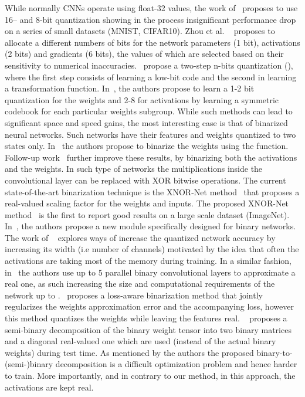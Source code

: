 \documentclass[10pt,twocolumn,letterpaper]{article}
\begin{document}
While normally CNNs operate using float-32 values, the work of~\cite{courbariaux2014training, lin2015fixed} proposes to use 16-- and 8-bit quantization showing in the process insignificant performance drop on a series of small datasets (MNIST, CIFAR10). Zhou et al. ~\cite{zhou2016dorefa} proposes to allocate a different numbers of bits for the network parameters (1 bit), activations (2 bits) and gradients (6 bits), the values of which are selected based on their sensitivity to numerical inaccuracies. \cite{wang2018two}~propose a two-step n-bits quantization (), where the first step consists of learning a low-bit code and the second in learning a transformation function. In~\cite{faraone2018syq}, the authors propose to learn a 1-2 bit quantization for the weights and 2-8 for activations by learning a symmetric codebook for each particular weights subgroup. While such methods can lead to significant space and speed gains, the most interesting case is that of binarized neural networks. Such networks have their features and weights quantized to two states only. In~\cite{soudry2014expectation} the authors propose to binarize the weights using the  function. Follow-up work~\cite{courbariaux2015binaryconnect, courbariaux2016binarized} further improve these results, by binarizing both the activations and the weights. In such type of networks the multiplications inside the convolutional layer can be replaced with XOR bitwise operations. The current state-of-the-art binarization technique is the XNOR-Net method~\cite{rastegari2016xnor} that proposes a real-valued scaling factor for the weights and inputs. The proposed XNOR-Net method~\cite{rastegari2016xnor} is the first to report good results on a large scale dataset (ImageNet). In~\cite{bulat2017binarized}, the authors propose a new module specifically designed for binary networks. The work of ~\cite{mishra2017wrpn} explores ways of increase the quantized network accuracy by increasing its width (i.e number of channels) motivated by the idea that often the activations are taking most of the memory during training. In a similar fashion, in~\cite{lin2017towards} the authors use up to 5 parallel binary convolutional layers to approximate a real one, as such increasing the size and computational requirements of the network up to . \cite{zhou2018explicit}~proposes a loss-aware binarization method that jointly regularizes the weights approximation error and the accompanying loss, however this method quantizes the weights while leaving the features real. ~\cite{hu2018training} proposes a semi-binary decomposition of the binary weight tensor into two binary matrices and a diagonal real-valued one which are used (instead of the actual binary weights) during test time. As mentioned by the authors the proposed binary-to-(semi-)binary decomposition is a difficult optimization problem and hence harder to train. More importantly, and in contrary to our method, in this approach, the activations are kept real. 
\end{document}
